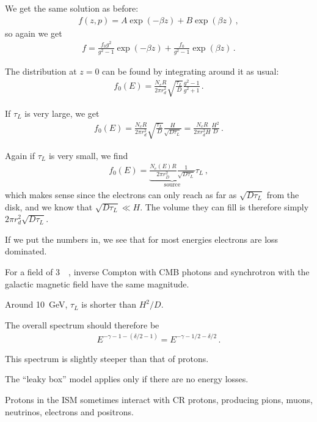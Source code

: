 \documentclass[main.tex]{subfiles}
\begin{document}
We get the same solution as before: 
%
\begin{align}
f(z, p)= A \exp(- \beta z) + B \exp(\beta z)
\,,
\end{align}
%
so again we get 
%
\begin{align}
f = \frac{f_0 g^2}{g^2 - 1} \exp(- \beta z) + \frac{f_0 }{g^2-1} \exp(\beta z)
\,. 
\end{align}

The distribution at \(z=0\) can be found by integrating around it as usual: 
%
\begin{align}
f_0 (E) = \frac{N_e R}{2 \pi r_d^2} \sqrt{ \frac{\tau_L}{D}} \frac{g^2- 1}{g^2 + 1}
\,.
\end{align}

If \(\tau _L\) is very large, we get 
%
\begin{align}
f_0 (E) = \frac{N_e R}{ 2 \pi r_d^2} \sqrt{\frac{\tau _L}{D}} \frac{H}{\sqrt{D \tau _L}} = \frac{N_e R}{2 \pi r_d^2 H} \frac{H^2}{D}
\,.
\end{align}

Again if \(\tau _L \) is very small, we find 
%
\begin{align}
f_0 (E) = \underbrace{\frac{N_e(E) R }{2 \pi r_D^2} \frac{1}{\sqrt{D \tau _L}}}_{\text{source}} \tau _L
\,,
\end{align}
%
which makes sense since the electrons can only reach as far as \(\sqrt{D \tau _L}\) from the disk, and we know that \(\sqrt{D \tau _L} \ll H\). 
The volume they can fill is therefore simply \(2 \pi r_d^2 \sqrt{D \tau _L}\). 

If we put the numbers in, we see that for most energies electrons are loss dominated. 

For a field of \SI{3}{\micro \gauss}, inverse Compton with CMB photons and synchrotron with the galactic magnetic field have the same magnitude. 

Around \SI{10}{GeV}, \(\tau _L\) is shorter than \(H^2 / D\). 

The overall spectrum should therefore be 
%
\begin{align}
E^{-\gamma -1 - (\delta /2 - 1) } = E^{-\gamma - 1/2 - \delta /2}
\,.
\end{align}

This spectrum is slightly steeper than that of protons. 

The ``leaky box'' model applies only if there are no energy losses. 

Protons in the ISM sometimes interact with CR protons, producing pions, muons, neutrinos, electrons and positrons. 
\end{document}

